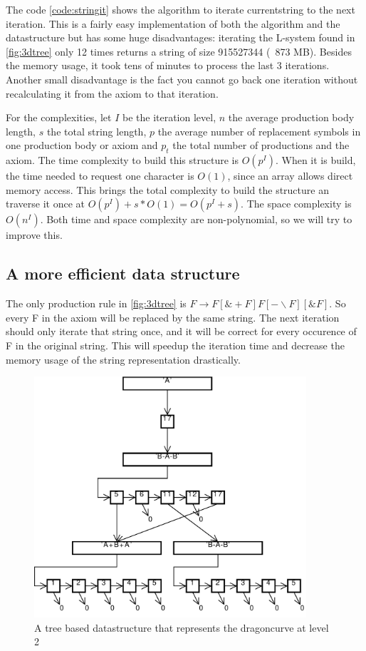 \documentclass[11pt,a4paper]{article}
\begin{document}
The code \ref{code:stringit} shows the algorithm to iterate currentstring to the next iteration. This is a fairly easy implementation of both the algorithm and the datastructure but has some huge disadvantages: iterating the L-system found in \ref{fig:3dtree} only 12 times returns a string of size 915527344 (~873 MB). Besides the memory usage, it took tens of minutes to process the last 3 iterations. Another small disadvantage is the fact you cannot go back one iteration without recalculating it from the axiom to that iteration.

For the complexities, let $I$ be the iteration level, $n$ the average production body length, $s$ the total string length, $p$ the average number of replacement symbols in one production body or axiom and $p_t$ the total number of productions and the axiom.
The time complexity to build this structure is $O(p^I)$. When it is build, the time needed to request one character is $O(1)$, since an array allows direct memory access. This brings the total complexity to build the structure an traverse it once at $O(p^I)+s*O(1) = O(p^I+s)$.
The space complexity is $O(n^I)$. Both time and space complexity are non-polynomial, so we will try to improve this.

\subsection{A more efficient data structure} %

The only production rule in \ref{fig:3dtree} is $F \rightarrow F[\&+F]F[-\backslash F][\&F]$. So every F in the axiom will be replaced by the same string. The next iteration should only iterate that string once, and it will be correct for every occurence of F in the original string. This will speedup the iteration time and decrease the memory usage of the string representation drastically.


\begin{figure}[h!]
  \centering
  \includegraphics[width=0.9\textwidth]{struct.pdf}
  \caption{A tree based datastructure that represents the dragoncurve at level 2}
  \label{fig:struct}
\end{figure}
\end{document}
